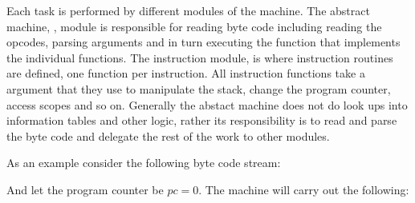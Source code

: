 Each task is performed by different modules of the machine. The abstract
machine, , module is responsible for reading byte code including
reading the opcodes, parsing arguments and in turn executing the function that
implements the individual functions. The instruction module,
 is where instruction routines are defined, one function
per instruction. All instruction functions take a  argument
that they use to manipulate the stack, change the program counter, access scopes
and so on. Generally the abstact machine does not do look ups into information
tables and other logic, rather its responsibility is to read and parse the byte
code and delegate the rest of the work to other modules.

As an example consider the following byte code stream:


And let the program counter be $pc = 0$. The machine will carry out the following:

